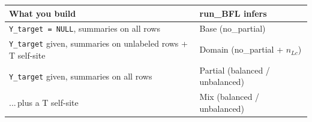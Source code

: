 \documentclass[11pt]{article}
\begin{document}
\begin{center}
\renewcommand{\arraystretch}{1.3}
\begin{tabularx}{\textwidth}{@{}Y >{\ttfamily}l@{}}
\toprule
\normalfont\textbf{What you build} & \normalfont\textbf{run\_BFL infers}\\
\midrule
\texttt{Y\_target = NULL}, summaries on all rows                       & Base (no\_partial)\\
\texttt{Y\_target} given, summaries on unlabeled rows + T self-site    & Domain (no\_partial + $n_{Lc}$)\\
\texttt{Y\_target} given, summaries on all rows                        & Partial (balanced / unbalanced)\\
\quad ...\,plus a T self-site                                          & Mix (balanced / unbalanced)\\
\bottomrule
\end{tabularx}
\end{center}
\end{document}
